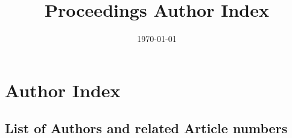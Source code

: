 \documentclass[10pt, letterpaper]{article}
\title{\conferenceAcronym Proceedings Author Index}
\author{}
\date{\today}
\begin{document}
\section{Author Index}

\subsection{List of Authors and related Article numbers}

\end{document}

